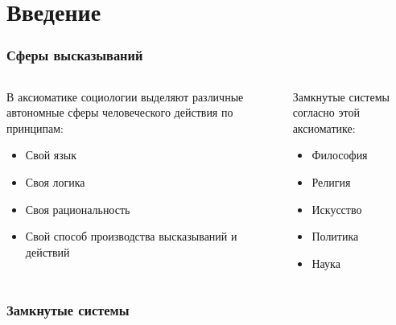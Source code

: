 \section{Введение}
\begin{frame}
    \frametitle{Сферы высказываний}
    \begin{columns}
        \begin{column}{0.5\textwidth}
            В аксиоматике социологии выделяют различные автономные сферы
            человеческого действия по принципам:
            \begin{itemize}[<+->]
                \item Свой язык
                \item Своя логика
                \item Своя рациональность
                \item Свой способ производства высказываний и действий
            \end{itemize}
        \end{column}
        \begin{column}{0.5\textwidth}
            Замкнутые системы согласно этой аксиоматике:
            \begin{itemize}[<+->]
                \item Философия
                \item Религия
                \item Искусство
                \item Политика
                \item Наука
            \end{itemize}
        \end{column}
    \end{columns}
\end{frame}

\begin{frame}
    \frametitle{Замкнутые системы}
    \par\vspace{0.3cm}
\end{frame}


